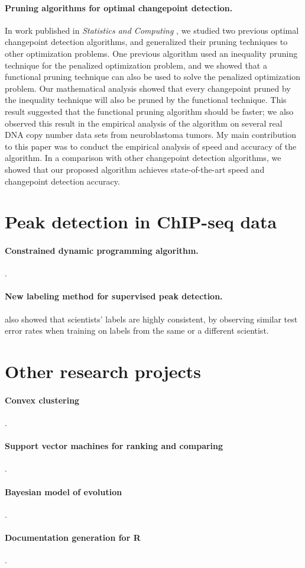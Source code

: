 \documentclass{article}
\begin{document}
\paragraph{Pruning algorithms for optimal changepoint detection.} In
work published in \emph{Statistics and Computing} \citep{fpop}, we
studied two previous optimal changepoint detection algorithms, and
generalized their pruning techniques to other optimization
problems. One previous algorithm used an inequality pruning technique
for the penalized optimization problem, and we showed that a
functional pruning technique can also be used to solve the penalized
optimization problem. Our mathematical analysis showed that every
changepoint pruned by the inequality technique will also be pruned by
the functional technique. This result suggested that the functional
pruning algorithm should be faster; we also observed this result in
the empirical analysis of the algorithm on several real DNA copy
number data sets from neuroblastoma tumors. My main contribution to
this paper was to conduct the empirical analysis of speed and accuracy
of the algorithm. In a comparison with other changepoint detection
algorithms, we showed that our proposed algorithm achieves
state-of-the-art speed and changepoint detection
accuracy. 

\section{Peak detection in ChIP-seq data}

\paragraph{Constrained dynamic programming algorithm.} \citep{HOCKING-PeakSeg}.

\paragraph{New labeling method for supervised peak detection.}also
showed that scientists' labels are highly consistent, by observing
similar test error rates when training on labels from the same or a
different scientist.

\section{Other research projects}

\paragraph{Convex clustering} \citep{HOCKING-clusterpath}.

\paragraph{Support vector machines for ranking and comparing}\citep{svmcompare}.

\paragraph{Bayesian model of evolution} \citep{HOCKING-evolution}.

\paragraph{Documentation generation for R} \citep{hocking13:inlinedocs}.



\end{document}
